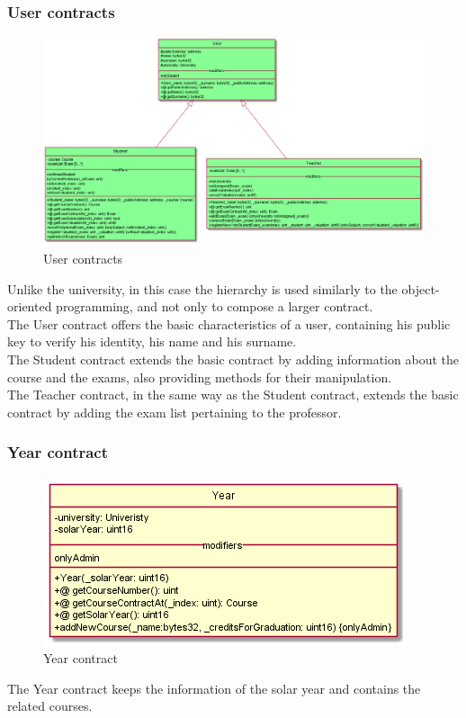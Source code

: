 \documentclass[ManualeSviluppatore.tex]{subfiles}
\begin{document}
\subsubsection{User contracts}
\begin{figure}[H]
	\centering
	\includegraphics[width=0.9\linewidth]{"diagrammi/solidity/user"}
	\caption{User contracts}
	\label{fig:User contracts}
\end{figure}
Unlike the university, in this case the hierarchy is used similarly to the object-oriented programming, and not only to compose a larger contract. \\
The User contract offers the basic characteristics of a user, containing his public key to verify his identity, his name and his surname. \\
The Student contract extends the basic contract by adding information about the course and the exams, also providing methods for their manipulation. \\
The Teacher contract, in the same way as the Student contract, extends the basic contract by adding the exam list pertaining to the professor. \\

\subsubsection{Year contract}
\begin{figure}[H]
	\centering
	\includegraphics[width=0.7\linewidth]{"diagrammi/solidity/year"}
	\caption{Year contract}
	\label{fig:Year contract}
\end{figure}
The Year contract keeps the information of the solar year and contains the related courses. \\
\end{document}
